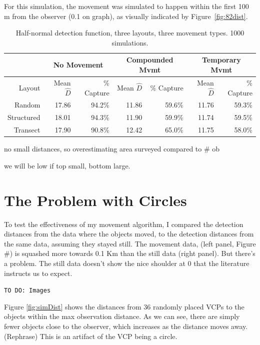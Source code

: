 \documentclass[12pt]{article}
\begin{document}
For this simulation, the movement was simulated to happen within the first 100 m from the observer (0.1 on graph), as visually indicated by Figure~\ref{fig:82dist}. 


\begin{table}
	\caption{Half-normal detection function, three layouts, three movement types. 1000 simulations.}
	\begin{tabular}{ r| r r| r r| r r|}
	
		& \multicolumn{2}{|c|}{No Movement}	& \multicolumn{2}{|c|}{Compounded Mvmt}	& \multicolumn{2}{|c|}{Temporary Mvmt}\\ 
 \hline \hline
 
 Layout		& Mean $\hat{D}$	& \% Capture & Mean $\hat{D}$ & \% Capture & Mean $\hat{D}$ & \% Capture	\\ \hline \hline
 Random		& 17.86 			& 94.2\% 		& 11.86	& 59.6\%	& 11.76	& 59.3\% \\
 Structured	& 18.01 			& 94.3\% 		& 11.90 & 59.9\% 	& 11.74 & 59.5\% \\
 Transect	& 17.90 			& 90.8\% 		& 12.42 & 65.0\% 	& 11.75 & 58.0\% \\ \hline

	\end{tabular}
	\label{table:sim2}
\end{table}

no small distances, so overestimating area surveyed compared to # ob

we will be low if top small, bottom large.



\section{The Problem with Circles}
To test the effectiveness of my movement algorithm, I compared the detection distances from the data where the objects moved, to the detection distances from the same data, assuming they stayed still. The movement data, (left panel, Figure \#) is squashed more towards 0.1 Km than the still data (right panel). But there's a problem. The still data doesn't show the nice shoulder at 0 that the literature instructs us to expect.

\texttt{TO DO: Images}

Figure \ref{fig:simDist} shows the distances from 36 randomly placed VCPs to the objects within the max observation distance. As we can see, there are simply fewer objects close to the observer, which increases as the distance moves away. (Rephrase) This is an artifact of the VCP being a circle. 
\end{document}
